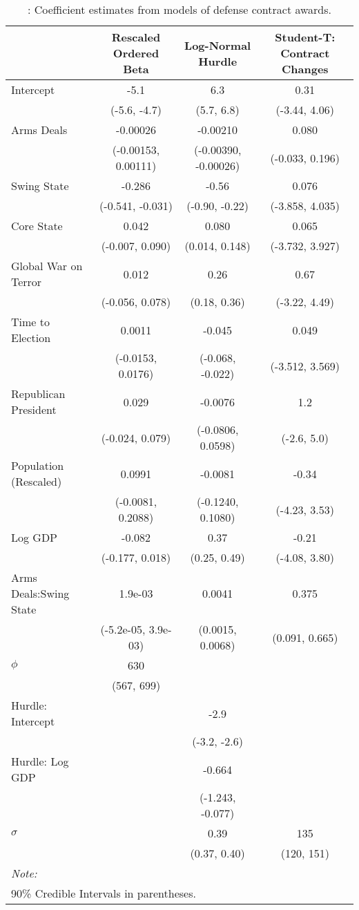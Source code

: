 \begingroup\fontsize{8}{10}\selectfont

\begin{longtable}[t]{lccc}
\caption{\label{tab:cont-regs}: Coefficient estimates from models of defense contract awards.}\\
\toprule
  & Rescaled Ordered Beta & Log-Normal Hurdle & Student-T: Contract Changes\\
\midrule
Intercept & -5.1 & 6.3 & 0.31\\
 & (-5.6, -4.7) & (5.7, 6.8) & (-3.44, 4.06)\\
Arms Deals & -0.00026 & -0.00210 & 0.080\\
 & (-0.00153, 0.00111) & (-0.00390, -0.00026) & (-0.033, 0.196)\\
Swing State & -0.286 & -0.56 & 0.076\\
 & (-0.541, -0.031) & (-0.90, -0.22) & (-3.858, 4.035)\\
Core State & 0.042 & 0.080 & 0.065\\
 & (-0.007, 0.090) & (0.014, 0.148) & (-3.732, 3.927)\\
Global War on Terror & 0.012 & 0.26 & 0.67\\
 & (-0.056, 0.078) & (0.18, 0.36) & (-3.22, 4.49)\\
Time to Election & 0.0011 & -0.045 & 0.049\\
 & (-0.0153, 0.0176) & (-0.068, -0.022) & (-3.512, 3.569)\\
Republican President & 0.029 & -0.0076 & 1.2\\
 & (-0.024, 0.079) & (-0.0806, 0.0598) & (-2.6, 5.0)\\
Population (Rescaled) & 0.0991 & -0.0081 & -0.34\\
 & (-0.0081, 0.2088) & (-0.1240, 0.1080) & (-4.23, 3.53)\\
Log GDP & -0.082 & 0.37 & -0.21\\
 & (-0.177, 0.018) & (0.25, 0.49) & (-4.08, 3.80)\\
Arms Deals:Swing State & 1.9e-03 & 0.0041 & 0.375\\
 & (-5.2e-05, 3.9e-03) & (0.0015, 0.0068) & (0.091, 0.665)\\
$\phi$ & 630 &  & \\
 & (567, 699) &  & \\
Hurdle: Intercept &  & -2.9 & \\
 &  & (-3.2, -2.6) & \\
Hurdle: Log GDP &  & -0.664 & \\
 &  & (-1.243, -0.077) & \\
$\sigma$ &  & 0.39 & 135\\
 &  & (0.37, 0.40) & (120, 151)\\
\bottomrule
\multicolumn{4}{l}{\rule{0pt}{1em}\textit{Note: }}\\
\multicolumn{4}{l}{\rule{0pt}{1em}90\% Credible Intervals in parentheses.}\\
\end{longtable}
\endgroup{}

